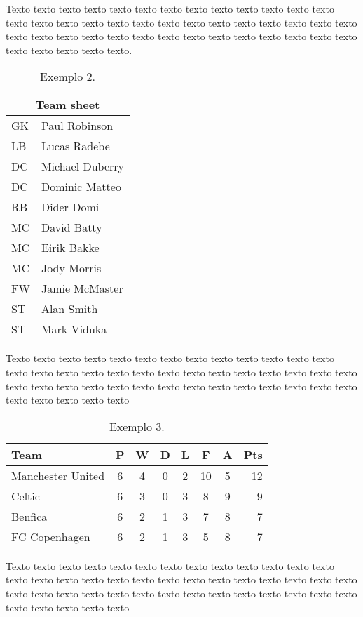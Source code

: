 \documentclass[tcc2]{uftex}
\begin{document}
Texto texto texto texto texto texto texto texto texto texto texto texto texto
texto texto texto texto texto texto texto texto texto texto texto texto texto
texto texto texto texto texto texto texto texto texto texto texto texto texto
texto texto texto texto texto texto texto. 

\begin{table}[!h]
\caption{Exemplo 2.}\label{tab:2}
\begin{tabular}{ |l|l| }
  \hline
  \multicolumn{2}{|c|}{Team sheet} \\
  \hline
  GK & Paul Robinson \\
  LB & Lucas Radebe \\
  DC & Michael Duberry \\
  DC & Dominic Matteo \\
  RB & Dider Domi \\
  MC & David Batty \\
  MC & Eirik Bakke \\
  MC & Jody Morris \\
  FW & Jamie McMaster \\
  ST & Alan Smith \\
  ST & Mark Viduka \\
  \hline
\end{tabular}
\end{table}

Texto texto texto texto texto texto texto texto texto texto texto texto texto
texto texto texto texto texto texto texto texto texto texto texto texto texto
texto texto texto texto texto texto texto texto texto texto texto texto texto
texto texto texto texto texto texto texto

\begin{table}[!h]
\caption{Exemplo 3.}\label{tab:3}
\begin{tabular}{l*{6}{c}r}
Team              & P & W & D & L & F  & A & Pts \\
\hline
Manchester United & 6 & 4 & 0 & 2 & 10 & 5 & 12  \\
Celtic            & 6 & 3 & 0 & 3 &  8 & 9 &  9  \\
Benfica           & 6 & 2 & 1 & 3 &  7 & 8 &  7  \\
FC Copenhagen     & 6 & 2 & 1 & 3 &  5 & 8 &  7  \\
\end{tabular}
\end{table}

Texto texto texto texto texto texto texto texto texto texto texto texto texto
texto texto texto texto texto texto texto texto texto texto texto texto texto
texto texto texto texto texto texto texto texto texto texto texto texto texto
texto texto texto texto texto texto texto
\end{document}
